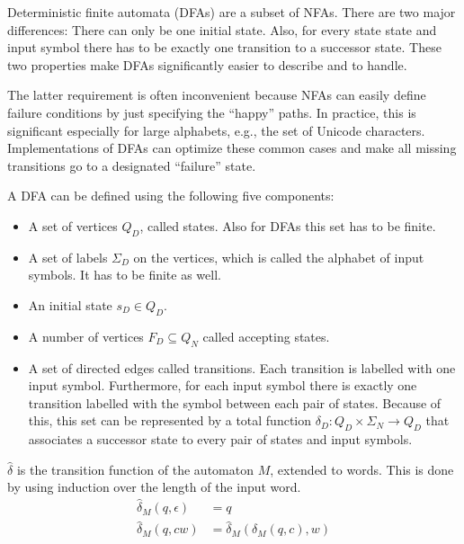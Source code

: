 Deterministic finite automata (DFAs) are a subset of NFAs.
There are two major differences: There can only be one initial state.
Also, for every state state and input symbol there
has to be exactly one transition to a successor state.
These two properties make DFAs significantly easier to describe and to handle.

The latter requirement is often inconvenient because NFAs can easily define
failure conditions by just specifying the ``happy'' paths.
In practice, this is significant especially for large alphabets, e.g.,
the set of Unicode characters.
Implementations of DFAs can optimize these common cases and
make all missing transitions go to a designated ``failure'' state.

\begin{definition}
    A DFA can be defined using the following five components:

    \begin{itemize}
        \item A set of vertices $Q_D$, called states.
            Also for DFAs this set has to be finite.
        \item A set of labels $\Sigma_D$ on the vertices,
            which is called the alphabet of input symbols.
            It has to be finite as well.
        \item An initial state $s_D \in Q_D$.
        \item A number of vertices $F_D \subseteq Q_N$ called accepting states.
        \item A set of directed edges called transitions.
            Each transition is labelled with one input symbol.
            Furthermore, for each input symbol there is
            exactly one transition labelled with the symbol between each pair of states.
            Because of this, this set can be represented by a total function
            $\delta_D : Q_D \times \Sigma_N \rightarrow Q_D$
            that associates a successor state to every pair of states and input symbols.
    \end{itemize}
\end{definition}

\begin{definition}
    $\hat\delta$ is the transition function of the automaton $M$, extended to words.
    This is done by using induction over the length of the input word.
    \begin{align}
        \hat\delta_M(q, \epsilon) &= q\\
        \hat\delta_M(q, c w) &= \hat\delta_M(\delta_M(q, c), w)
    \end{align}
\end{definition}

